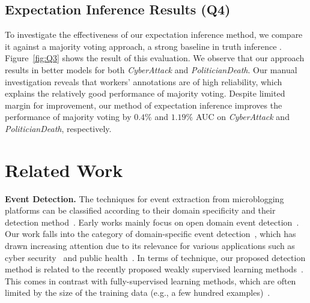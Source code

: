 \documentclass[letterpaper]{article}
\begin{document}
\subsection{Expectation Inference Results (Q4)}
To investigate the effectiveness of our expectation inference method, we compare it against a majority voting approach, a strong baseline in truth inference \cite{zheng2017truth}. Figure~\ref{fig:Q3} shows the result of this evaluation. We observe that our approach results in better models for both \emph{CyberAttack} and \emph{PoliticianDeath}. Our manual investigation reveals that workers' annotations are of high reliability, which explains the relatively good performance of majority voting. Despite limited margin for improvement, our method of expectation inference improves the performance of majority voting by $0.4\%$ and $1.19\%$ AUC on \emph{CyberAttack} and \emph{PoliticianDeath}, respectively.

\section{Related Work}
\label{sec:related}

\noindent\textbf{Event Detection.} 
The techniques for event extraction from microblogging platforms can be classified according to their domain specificity and their detection method~\cite{atefeh2015survey}. Early works mainly focus on open domain event detection~\cite{benson2011event,ritter2012open,chierichetti2014event}. Our work falls into the category of domain-specific event detection~\cite{bhardwaj2019TKDE}, which has drawn increasing attention due to its relevance for various applications such as cyber security~\cite{ritter2015weakly,chambers2018detecting} and public health~\cite{akbari2016tweets,lee2017adverse}. In terms of  technique, our proposed detection method is related to the recently proposed weakly supervised learning methods~\cite{ritter2015weakly,chang2016expectation,konovalov2017learning}. This comes in contrast with fully-supervised learning methods, which are often limited by the size of the training data (e.g., a few hundred examples)~\cite{sakaki2010earthquake,sadri2016online}.
\end{document}

